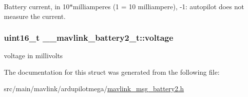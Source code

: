Battery current, in 10$\ast$milliamperes (1 = 10 milliampere), -\/1\+: autopilot does not measure the current. 

\hypertarget{struct____mavlink__battery2__t_a17ce235f43d135a9ff3eb21df2657519}{
\subsubsection[{voltage}]{\setlength{\rightskip}{0pt plus 5cm}uint16\+\_\+t \+\_\+\+\_\+mavlink\+\_\+battery2\+\_\+t\+::voltage}}\label{struct____mavlink__battery2__t_a17ce235f43d135a9ff3eb21df2657519}


voltage in millivolts 



The documentation for this struct was generated from the following file\+:\begin{DoxyCompactItemize}
\item 
src/main/mavlink/ardupilotmega/\hyperlink{mavlink__msg__battery2_8h}{mavlink\+\_\+msg\+\_\+battery2.\+h}\end{DoxyCompactItemize}
